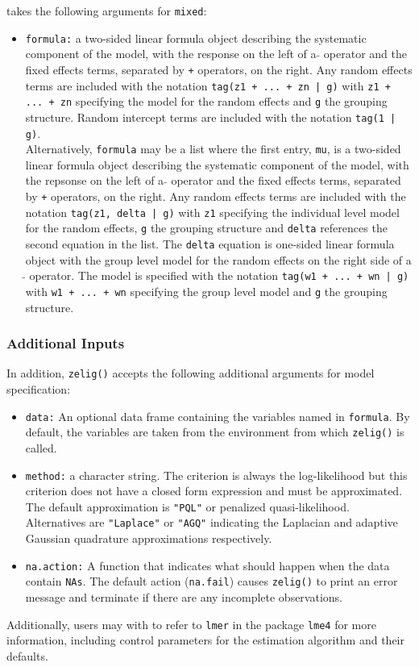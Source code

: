  takes the following arguments for {\tt mixed}:
\begin{itemize}
\item {\tt formula:} a two-sided linear formula object describing the systematic component of the model, with the response on the left of a {\tt $\tilde{}$} operator and the fixed effects terms, separated by {\tt +} operators, on the right. Any random effects terms are included with the notation {\tt tag(z1 + ... + zn | g)} with {\tt z1 + ... + zn} specifying the model for the random effects and {\tt g} the grouping structure. Random intercept terms are included with the notation {\tt tag(1 | g)}. \\
Alternatively, {\tt formula} may be a list where the first entry, {\tt mu}, is a two-sided linear formula object describing the systematic component of the model, with the repsonse on the left of a {\tt $\tilde{}$} operator and the fixed effects terms, separated by {\tt +} operators, on the right. Any random effects terms are included with the notation {\tt tag(z1, delta | g)} with {\tt z1} specifying the individual level model for the random effects, {\tt g} the grouping structure and {\tt delta} references the second equation in the list. The {\tt delta} equation is one-sided linear formula object with the group level model for the random effects on the right side of a {\tt $\tilde{}$} operator. The model is specified with the notation {\tt tag(w1 + ... + wn | g)} with {\tt w1 + ... + wn} specifying the group level model and {\tt g} the grouping structure.
\end{itemize}

\subsubsection{Additional Inputs}

In addition, {\tt zelig()} accepts the following additional arguments for model specification:

\begin{itemize}
\item {\tt data:} An optional data frame containing the variables named in {\tt formula}. By default, the variables are taken from the environment from which {\tt zelig()} is called.
\item {\tt method:} a character string. The criterion is always the log-likelihood but this criterion does not have a closed form expression and must be approximated. The default approximation is {\tt "PQL"} or penalized quasi-likelihood. Alternatives are {\tt "Laplace"} or {\tt "AGQ"} indicating the Laplacian and adaptive Gaussian quadrature approximations respectively.
\item {\tt na.action:} A function that indicates what should happen when the data contain {\tt NAs}. The default action ({\tt na.fail}) causes {\tt zelig()} to print an error message and terminate if there are any incomplete observations.
\end{itemize}
Additionally, users may with to refer to {\tt lmer} in the package {\tt lme4} for more information, including control parameters for the estimation algorithm and their defaults.

